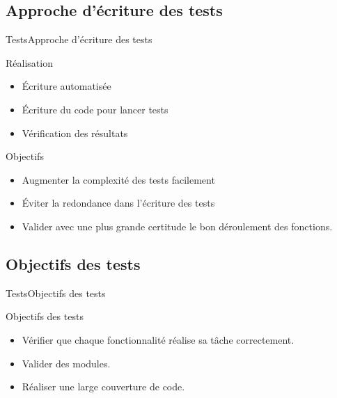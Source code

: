     \subsection{Approche d'écriture des tests}
      \begin{frame}{Tests}{Approche d'écriture des tests}
        \begin{block}{Réalisation}
          \begin{itemize}
            \item<1-> Écriture automatisée
            \item<2-> Écriture du code pour lancer tests
            \item<3-> Vérification des résultats
          \end{itemize}
        \end{block}
        \begin{block}{Objectifs}
          \begin{itemize}
            \item<4-> Augmenter la complexité des tests facilement
            \item<5-> Éviter la redondance dans l'écriture des tests
            \item<6-> Valider avec une plus grande certitude le bon déroulement des fonctions.
          \end{itemize}
        \end{block}
      \end{frame}
      
      \subsection{Objectifs des tests}
      \begin{frame}{Tests}{Objectifs des tests}
        \begin{block}{Objectifs des tests}
          \begin{itemize}
            \item<1-> Vérifier que chaque fonctionnalité réalise sa tâche correctement.
            \item<2-> Valider des modules.
            \item<3-> Réaliser une large couverture de code.
          \end{itemize}
        \end{block}
      \end{frame}  
